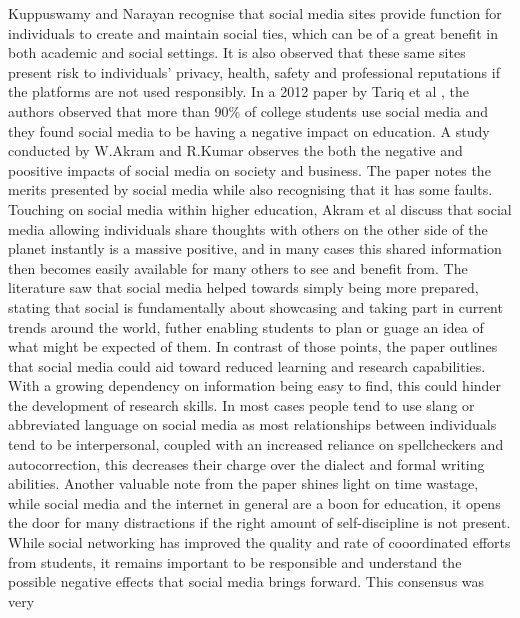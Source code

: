 \documentclass[lettersize,journal]{IEEEtran}
\begin{document}
    Kuppuswamy and Narayan \cite{Kuppuswamy et al 2010} recognise that social
    media sites provide function for individuals to create and maintain social
    ties, which can be of a great benefit in both academic and social settings.
    It is also observed that these same sites present risk to individuals'
    privacy, health, safety and professional reputations if the platforms are
    not used responsibly.
    In a 2012 paper by Tariq et al \cite{Tariq et al 2012}, the authors observed that more than 90\%
    of college students use social media \cite{Ellison et al 2007} 
    and they found social media to be having a negative impact on education. 
    A study conducted by W.Akram and R.Kumar \cite{Akram et al 2017} observes the both the negative
    and poositive impacts of social media on society and business.  The paper notes the merits presented by social media
    while also recognising that it has some faults. Touching on social media within higher education, Akram et al discuss that social media allowing individuals share thoughts with others on the other side of the planet instantly is a massive positive, and in many cases this shared information then becomes easily available for many others to see and benefit from. The literature saw that social media helped towards simply being more prepared, stating that social is fundamentally about showcasing and taking part in  current trends around the world, futher enabling students to plan or guage an idea of what might be expected of them. In contrast of those points, the paper outlines that social media could aid toward reduced learning and research capabilities. With a growing dependency on information being easy to find, this could hinder the development of research skills. In most cases people tend to use slang or abbreviated language on social media as most relationships between individuals tend to be interpersonal, coupled with an increased reliance on spellcheckers and autocorrection, this decreases their charge over the dialect and formal writing abilities. Another valuable note from the paper shines light on time wastage, while social media and the internet in general are a boon for education, it opens the door for many distractions if the right amount of self-discipline is not present. While social networking has improved the quality and rate of cooordinated efforts from students, it remains important to be responsible and understand the possible negative effects that social media brings forward. This consensus was very
\end{document}

